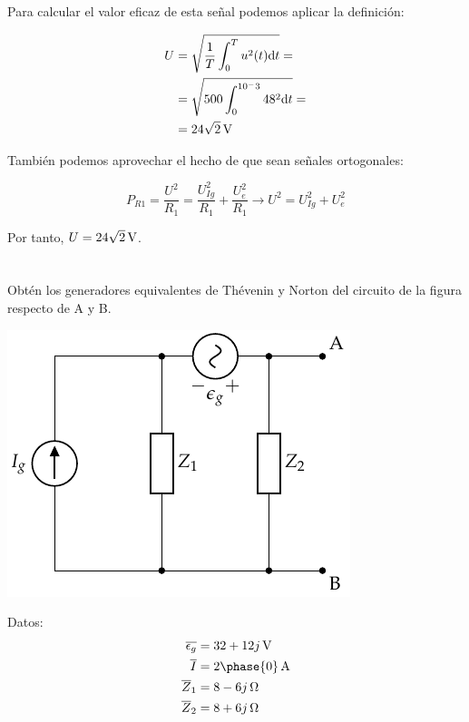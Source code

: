 \documentclass[12pt]{article}
\begin{document}
Para calcular el valor eficaz de esta señal podemos aplicar la definición:

\begin{align*}
  U &= \sqrt{\frac{1}{T}\int_0^Tu^2(t)\mathrm{d}t} = \\
    &= \sqrt{500 \int_0^{10^-3}48^2 \mathrm{d}t} = \\
  &= \SI[parse-numbers=false]{24\sqrt{2}}{\volt}
\end{align*}

También podemos aprovechar el hecho de que sean señales ortogonales:

\begin{equation*}
  P_{R1} = \frac{U^2}{R_1} = \frac{U_{Ig}^2}{R_1} + \frac{U_e^2}{R_1} \rightarrow U^2 = U_{Ig}^2 + U_e^2
\end{equation*}

Por tanto, $U = \SI[parse-numbers=false]{24\sqrt{2}}{\volt}$.

\clearpage


\section{}


Obtén los generadores equivalentes de Thévenin y Norton del circuito de la figura respecto de A y B.

\begin{center}
\includegraphics{../figs/Thevenin3}
\end{center}

Datos:
\begin{align*}
  \overline{\epsilon_g} &= \SI[parse-numbers=false]{32 + 12j}{\volt}\\
  \overline{I} &= \SI[parse-numbers=false]{2\phase{0}}{\ampere}\\
  \overline{Z}_1 &= \SI[parse-numbers=false]{8 - 6j}{\ohm}\\
  \overline{Z}_2 &= \SI[parse-numbers=false]{8 + 6j}{\ohm}
\end{align*}
\end{document}
